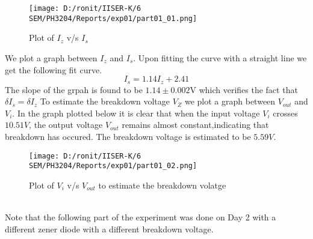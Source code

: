 \documentclass[12pt]{article}
\begin{document}
\begin{figure}[H]  
  \centering  
  \texttt{[image: D:/ronit/IISER-K/6 SEM/PH3204/Reports/exp01/part01\_01.png]}  %
  \caption{Plot of $I_z$ v/s $I_s$}  %
  \label{fig:part01_01}  %
\end{figure}\noindent
We plot a graph between $I_z$ and $I_s$. Upon fitting the curve with a straight line we get the following fit curve.
\begin{equation*}
	I_s = 1.14I_z + 2.41
\end{equation*}
The slope of the grpah is found to be $1.14 \pm 0.002$V which verifies the fact that $\delta I_s=\delta I_z$ 
\newpage
\noindent
To estimate the breakdown voltage $V_Z$ we plot a graph between $V_{out}$ and $V_{i}$. In the graph plotted below it is clear that when the input voltage $V_i$ crosses $10.51 V$, the output voltage $V_{out}$ remains almost constant,indicating that breakdown has occured. The breakdown voltage is estimated to be $5.59 V$.
\begin{figure}[H]  
	\centering  
	\texttt{[image: D:/ronit/IISER-K/6 SEM/PH3204/Reports/exp01/part01\_02.png]}  %
	\caption{Plot of $V_{i}$ v/s $V_{out}$ to estimate the breakdown volatge}  %
	\label{fig:part01_01}  %
  \end{figure}\noindent
\\
Note that the following part of the experiment was done on Day 2 with a different zener diode with a different breakdown voltage. 
\end{document}
